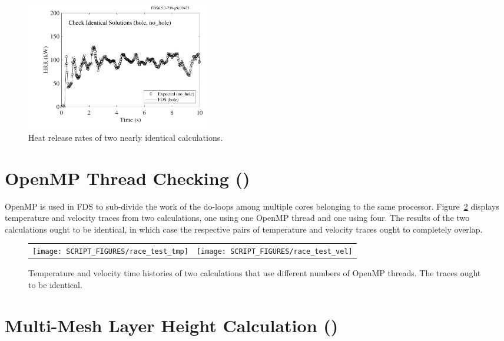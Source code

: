 \documentclass[11pt]{book}
\begin{document}
\begin{figure}[!ht]
\centering
\includegraphics[height=2.2in]{SCRIPT_FIGURES/hole_no_hole}
\caption[Results of the  test case]{Heat release rates of two nearly identical calculations.}
\label{hole_fig}
\end{figure}


\newpage

\section{OpenMP Thread Checking (\texorpdfstring{}{race\_test})}
\label{race_test}

OpenMP is used in FDS to sub-divide the work of the do-loops among multiple cores belonging to the same processor. Figure~\ref{race_test_fig} displays temperature and velocity traces from two calculations, one using one OpenMP thread and one using four. The results of the two calculations ought to be identical, in which case the respective pairs of temperature and velocity traces ought to completely overlap.

\begin{figure}[!ht]
\begin{tabular*}{\textwidth}{lr}
\texttt{[image: SCRIPT\_FIGURES/race\_test\_tmp]} &
\texttt{[image: SCRIPT\_FIGURES/race\_test\_vel]}
\end{tabular*}
\caption[Result of the ]{Temperature and velocity time histories of two calculations that use different numbers of OpenMP threads. The traces ought to be identical.}
\label{race_test_fig}
\end{figure}


\newpage

\section{Multi-Mesh Layer Height Calculation (\texorpdfstring{}{layer})}
\label{layer}
\end{document}
